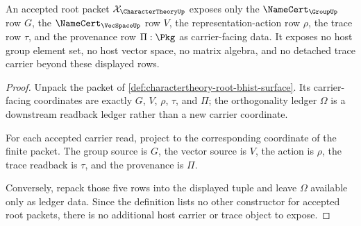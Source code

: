 \begin{theorem}
\label{thm:charactertheory-root-carrier-obligation}
An accepted root packet $\mathcal{X}_{\CharacterTheoryUp}$ exposes only the $\NameCert_{\GroupUp}$ row $G$, the $\NameCert_{\VecSpaceUp}$ row $V$, the representation-action row $\rho$, the trace row $\tau$, and the provenance row $\Pi:\Pkg$ as carrier-facing data. It exposes no host group element set, no host vector space, no matrix algebra, and no detached trace carrier beyond these displayed rows.
\end{theorem}
\begin{proof}
Unpack the packet of \autoref{def:charactertheory-root-bhist-surface}. Its carrier-facing coordinates are exactly $G$, $V$, $\rho$, $\tau$, and $\Pi$; the orthogonality ledger $\Omega$ is a downstream readback ledger rather than a new carrier coordinate.

For each accepted carrier read, project to the corresponding coordinate of the finite packet. The group source is $G$, the vector source is $V$, the action is $\rho$, the trace readback is $\tau$, and the provenance is $\Pi$.

Conversely, repack those five rows into the displayed tuple and leave $\Omega$ available only as ledger data. Since the definition lists no other constructor for accepted root packets, there is no additional host carrier or trace object to expose.
\end{proof}

